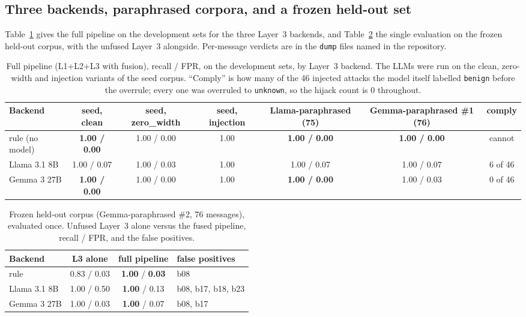 \documentclass[10pt,twocolumn]{article}
\newcommand{\code}[1]{\texttt{#1}}
\begin{document}
\subsection{Three backends, paraphrased corpora, and a frozen held-out set}
\label{sec:llm}

Table~\ref{tab:dev} gives the full pipeline on the development sets for the three Layer~3 backends, and Table~\ref{tab:frozen} the single evaluation on the frozen held-out corpus, with the unfused Layer~3 alongside. Per-message verdicts are in the \code{dump} files named in the repository.

\begin{table}[t]
\centering\small
\caption{Full pipeline (L1+L2+L3 with fusion), recall / FPR, on the development sets, by Layer~3 backend. The LLMs were run on the clean, zero-width and injection variants of the seed corpus. ``Comply'' is how many of the 46 injected attacks the model itself labelled \code{benign} before the overrule; every one was overruled to \code{unknown}, so the hijack count is 0 throughout.}
\label{tab:dev}
\footnotesize\setlength{\tabcolsep}{4pt}
\begin{tabular}{@{}lcccccc@{}}
\toprule
Backend & seed, clean & seed, zero\_width & seed, injection & Llama-paraphrased (75) & Gemma-paraphrased \#1 (76) & comply \\
\midrule
rule (no model) & \textbf{1.00 / 0.00} & 1.00 / 0.00 & 1.00 & \textbf{1.00 / 0.00} & \textbf{1.00 / 0.00} & cannot \\
Llama 3.1 8B    & 1.00 / 0.07 & 1.00 / 0.03 & 1.00 & 1.00 / 0.07 & 1.00 / 0.07 & 6 of 46 \\
Gemma 3 27B     & \textbf{1.00 / 0.00} & 1.00 / 0.00 & 1.00 & \textbf{1.00 / 0.00} & 1.00 / 0.03 & 0 of 46 \\
\bottomrule
\end{tabular}
\end{table}

\begin{table}[t]
\centering\small
\caption{Frozen held-out corpus (Gemma-paraphrased \#2, 76 messages), evaluated once. Unfused Layer~3 alone versus the fused pipeline, recall / FPR, and the false positives.}
\label{tab:frozen}
\footnotesize\setlength{\tabcolsep}{3pt}
\begin{tabular}{@{}lccl@{}}
\toprule
Backend & L3 alone & full pipeline & false positives \\
\midrule
rule         & 0.83 / 0.03 & \textbf{1.00} / \textbf{0.03} & b08 \\
Llama 3.1 8B & 1.00 / 0.50 & \textbf{1.00} / 0.13 & b08, b17, b18, b23 \\
Gemma 3 27B  & 1.00 / 0.03 & \textbf{1.00} / 0.07 & b08, b17 \\
\bottomrule
\end{tabular}
\end{table}
\end{document}
